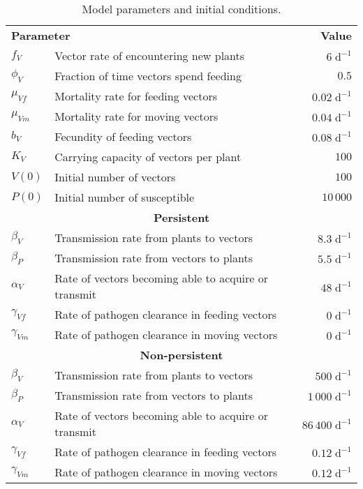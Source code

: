 \documentclass{article}
\begin{document}
\begin{table}
  \centering
  \begin{tabular}{llr}
    \multicolumn{2}{l}{\textbf{Parameter}}
    & \multicolumn{1}{r}{\textbf{Value}}
    \\
    $f_V$ & Vector rate of encountering new plants & $6\;\text{d}^{-1}$
    \\
    $\phi_V$ & Fraction of time vectors spend feeding & $0.5$
    \\
    $\mu_{Vf}$ & Mortality rate for feeding vectors & $0.02\;\text{d}^{-1}$
    \\
    $\mu_{Vm}$ & Mortality rate for moving vectors & $0.04\;\text{d}^{-1}$
    \\
    $b_V$ & Fecundity of feeding vectors & $0.08\;\text{d}^{-1}$
    \\
    $K_V$ & Carrying capacity of vectors per plant & $100$
    \\
    $V(0)$ & Initial number of vectors & $100$
    \\
    $P(0)$ & Initial number of susceptible & $10\,000$
    \\
    \multicolumn{3}{c}{\textbf{Persistent}}
    \\
    $\beta_V$ & Transmission rate from plants to vectors & $8.3\;\text{d}^{-1}$
    \\
    $\beta_P$ & Transmission rate from vectors to plants & $5.5\;\text{d}^{-1}$
    \\
    $\alpha_V$ & Rate of vectors becoming able to acquire or transmit & $48\;\text{d}^{-1}$
    \\
    $\gamma_{Vf}$ & Rate of pathogen clearance in feeding vectors & $0\;\text{d}^{-1}$
    \\
    $\gamma_{Vm}$ & Rate of pathogen clearance in moving vectors & $0\;\text{d}^{-1}$
    \\
    \multicolumn{3}{c}{\textbf{Non-persistent}}
    \\
    $\beta_V$ & Transmission rate from plants to vectors & $500\;\text{d}^{-1}$
    \\
    $\beta_P$ & Transmission rate from vectors to plants & $1\,000\;\text{d}^{-1}$
    \\
    $\alpha_V$ & Rate of vectors becoming able to acquire or transmit & $86\,400\;\text{d}^{-1}$
    \\
    $\gamma_{Vf}$ & Rate of pathogen clearance in feeding vectors & $0.12\;\text{d}^{-1}$ \\
    $\gamma_{Vm}$ & Rate of pathogen clearance in moving vectors & $0.12\;\text{d}^{-1}$
  \end{tabular}
  \caption{Model parameters and initial conditions.}
  \label{params}
\end{table}
\end{document}
